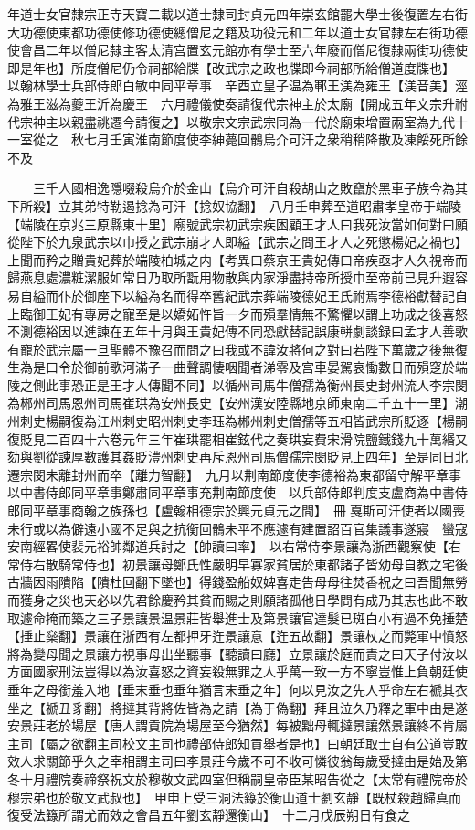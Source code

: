 年道士女官隸宗正寺天寶二載以道士隸司封貞元四年崇玄館罷大學士後復置左右街大功德使東都功德使修功德使總僧尼之籍及功役元和二年以道士女官隸左右街功德使會昌二年以僧尼隸主客太清宫置玄元館亦有學士至六年廢而僧尼復隸兩街功德使即是年也】所度僧尼仍令祠部給牒【改武宗之政也牒即今祠部所給僧道度牒也】　以翰林學士兵部侍郎白敏中同平章事　辛酉立皇子温為鄆王渼為雍王【渼音美】涇為雅王滋為夔王沂為慶王　六月禮儀使奏請復代宗神主於太廟【開成五年文宗升祔代宗神主以親盡祧遷今請復之】以敬宗文宗武宗同為一代於廟東增置兩室為九代十一室從之　秋七月壬寅淮南節度使李紳薨回鶻烏介可汗之衆稍稍降散及凍餒死所餘不及

　　三千人國相逸隱啜殺烏介於金山【烏介可汗自殺胡山之敗竄於黑車子族今為其下所殺】立其弟特勒遏捻為可汗【捻奴協翻】　八月壬申葬至道昭肅孝皇帝于端陵【端陵在京兆三原縣東十里】廟號武宗初武宗疾困顧王才人曰我死汝當如何對曰願從陛下於九泉武宗以巾授之武宗崩才人即縊【武宗之問王才人之死懲楊妃之禍也】上聞而矜之贈貴妃葬於端陵柏城之内【考異曰蔡京王貴妃傳曰帝疾亟才人久視帝而歸燕息處濃粧潔服如常日乃取所翫用物散與内家淨盡持帝所授巾至帝前已見升遐容易自縊而仆於御座下以縊為名而得卒舊紀武宗葬端陵德妃王氏祔焉李德裕獻替記自上臨御王妃有專房之寵至是以嬌妬忤旨一夕而殞羣情無不驚懼以謂上功成之後喜怒不測德裕因以進諫在五年十月與王貴妃傳不同恐獻替記誤康軿劇談録曰孟才人善歌有寵於武宗屬一旦聖體不豫召而問之曰我或不諱汝將何之對曰若陛下萬歲之後無復生為是口令於御前歌河滿子一曲聲調悽咽聞者涕零及宫車晏駕哀慟數日而殞窆於端陵之側此事恐正是王才人傳聞不同】以循州司馬牛僧孺為衡州長史封州流人李宗閔為郴州司馬恩州司馬崔珙為安州長史【安州漢安陸縣地京師東南二千五十一里】潮州刺史楊嗣復為江州刺史昭州刺史李珏為郴州刺史僧孺等五相皆武宗所貶逐【楊嗣復貶見二百四十六卷元年三年崔珙罷相崔鉉代之奏珙妄費宋滑院鹽鐵錢九十萬緡又劾與劉從諫厚數護其姦貶澧州刺史再斥恩州司馬僧孺宗閔貶見上四年】至是同日北遷宗閔未離封州而卒【離力智翻】　九月以荆南節度使李德裕為東都留守解平章事以中書侍郎同平章事鄭肅同平章事充荆南節度使　以兵部侍郎判度支盧商為中書侍郎同平章事商翰之族孫也【盧翰相德宗於興元貞元之間】　冊戛斯可汗使者以國喪未行或以為僻遠小國不足與之抗衡回鶻未平不應遽有建置詔百官集議事遂寢　蠻寇安南經畧使裴元裕帥鄰道兵討之【帥讀曰率】　以右常侍李景讓為浙西觀察使【右常侍右散騎常侍也】初景讓母鄭氏性嚴明早寡家貧居於東都諸子皆幼母自教之宅後古牆因雨隤陷【隤杜回翻下墜也】得錢盈船奴婢喜走告母母往焚香祝之曰吾聞無勞而獲身之災也天必以先君餘慶矜其貧而賜之則願諸孤他日學問有成乃其志也此不敢取遽命掩而築之三子景讓景温景莊皆舉進士及第景讓官達髮已斑白小有過不免捶楚【捶止橤翻】景讓在浙西有左都押牙迕景讓意【迕五故翻】景讓杖之而斃軍中憤怒將為變母聞之景讓方視事母出坐聽事【聽讀曰廳】立景讓於庭而責之曰天子付汝以方面國家刑法豈得以為汝喜怒之資妄殺無罪之人乎萬一致一方不寧豈惟上負朝廷使垂年之母銜羞入地【垂末垂也垂年猶言末垂之年】何以見汝之先人乎命左右褫其衣坐之【褫丑豸翻】將撻其背將佐皆為之請【為于偽翻】拜且泣久乃釋之軍中由是遂安景莊老於場屋【唐人謂貢院為場屋至今猶然】每被黜母輒撻景讓然景讓終不肯屬主司【屬之欲翻主司校文主司也禮部侍郎知貢舉者是也】曰朝廷取士自有公道豈敢效人求關節乎久之宰相謂主司曰李景莊今歲不可不收可憐彼翁每歲受撻由是始及第　冬十月禮院奏禘祭祝文於穆敬文武四室但稱嗣皇帝臣某昭告從之【太常有禮院帝於穆宗弟也於敬文武叔也】　甲申上受三洞法籙於衡山道士劉玄靜【既杖殺趙歸真而復受法籙所謂尤而效之會昌五年劉玄靜還衡山】　十二月戊辰朔日有食之

